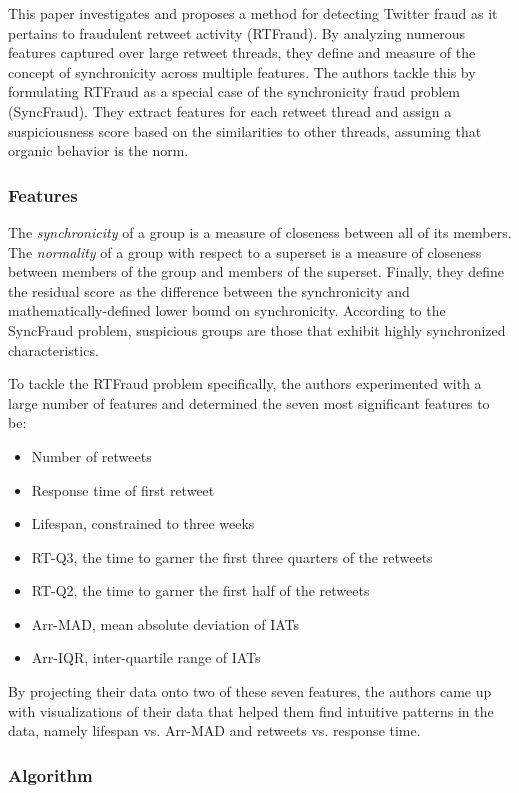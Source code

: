 \documentclass[11pt, oneside]{article}   	%
\begin{document}
\quad This paper investigates and proposes a method for detecting Twitter fraud as it pertains to fraudulent retweet activity (RTFraud).
By analyzing numerous features captured over large retweet threads, they define and measure of the concept of synchronicity across multiple features.
The authors tackle this by formulating RTFraud as a special case of the synchronicity fraud problem (SyncFraud).
They extract features for each retweet thread and assign a suspiciousness score based on the similarities to other threads, assuming that organic behavior is the norm.

\subsubsection*{Features}

\quad The \textit{synchronicity} of a group is a measure of closeness between all of its members.
The \textit{normality} of a group with respect to a superset is a measure of closeness between members of the group and members of the superset.
Finally, they define the residual score as the difference between the synchronicity and mathematically-defined lower bound on synchronicity.
According to the SyncFraud problem, suspicious groups are those that exhibit highly synchronized characteristics.

\quad To tackle the RTFraud problem specifically, the authors experimented with a large number of features and determined the seven most significant features to be:
\begin{itemize}
	\item Number of retweets
	\item Response time of first retweet
	\item Lifespan, constrained to three weeks
	\item RT-Q3, the time to garner the first three quarters of the retweets
	\item RT-Q2, the time to garner the first half of the retweets
	\item Arr-MAD, mean absolute deviation of IATs
	\item Arr-IQR, inter-quartile range of IATs
\end{itemize}

\quad By projecting their data onto two of these seven features, the authors came up with visualizations of their data that helped them find intuitive patterns in the data, namely lifespan vs. Arr-MAD and retweets vs. response time.

\subsubsection*{Algorithm}
\end{document}

